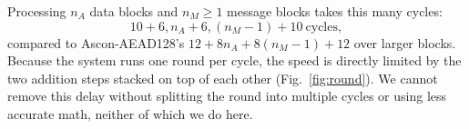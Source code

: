 Processing $n_A$ data blocks and $n_M \ge 1$ message blocks takes this many cycles:
\begin{equation}
10 + 6,n_A + 6,(n_M - 1) + 10 \ \text{cycles},
\label{eq:cycles}
\end{equation}
compared to Ascon-AEAD128's $12 + 8n_A + 8(n_M-1) + 12$ over larger blocks. Because the system runs one round per cycle, the speed is directly limited by the two addition steps stacked on top of each other (Fig.~\ref{fig:round}). We cannot remove this delay without splitting the round into multiple cycles or using less accurate math, neither of which we do here.
